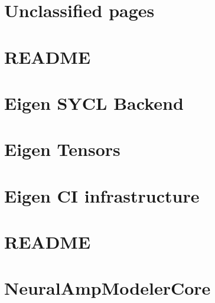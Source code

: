 \let\mypdfximage\pdfximage\def\pdfximage{\immediate\mypdfximage}\documentclass[twoside]{book}
\newcommand{\+}{\discretionary{\mbox{\scriptsize$\hookleftarrow$}}{}{}}
\begin{document}
\chapter{Unclassified pages}
\label{_unclassified_pages}

\chapter{R\+E\+A\+D\+ME}
\label{md__c_1__users_fab_src__github_branches__neural_amp_modeler_plugin_eigen__r_e_a_d_m_e}

\chapter{Eigen S\+Y\+CL Backend}
\label{_s_y_c_l__e_i_g_e_n}

\chapter{Eigen Tensors}
\label{eigen_tensors}

\chapter{Eigen CI infrastructure}
\label{md__c_1__users_fab_src__github_branches__neural_amp_modeler_plugin__neural_amp_modeler__neural_a55da06c62cab128b0178d5c37e3093e3}

\chapter{R\+E\+A\+D\+ME}
\label{md__c_1__users_fab_src__github_branches__neural_amp_modeler_plugin__neural_amp_modeler__neural_a51da621589166de2f112150b0ef16b63}

\chapter{Neural\+Amp\+Modeler\+Core}
\label{md__c_1__users_fab_src__github_branches__neural_amp_modeler_plugin__neural_amp_modeler__neural_amp_modeler_core__r_e_a_d_m_e}

\end{document}
